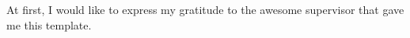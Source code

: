 At first, I would like to express my gratitude to the awesome supervisor that gave me this template.